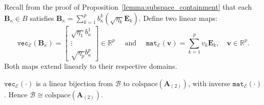 \documentclass{siamart251216}
\newcommand{\munfold}[2]{\mathbf{#1}_{(#2)}}
\def\bB{\mathbf{B}}
\def\bE{\mathbf{E}}
\def\bv{\mathbf{v}}
\begin{document}
Recall from the proof of Proposition~\ref{lemma:subspace_containment} that each $\bB_\kappa\in B$
satisfies $\bB_\kappa = \sum_{k=1}^p b_\kappa^k(\sqrt{\eta_k}\bE_k)$.  Define two linear maps:
\begin{equation}
\label{eq:vec_mat_ops}
    \mathtt{vec}_{\mathscr{E}}(\bB_\kappa)
    = \begin{bmatrix}\sqrt{\eta_1}b_\kappa^1\\\vdots\\\sqrt{\eta_p}b_\kappa^p\end{bmatrix}\in\mathbb{R}^p \quad  \mbox{ and } \quad
    \mathtt{mat}_{\mathscr{E}}(\bv) = \sum_{k=1}^p v_k\bE_k,\quad\bv\in\mathbb{R}^p.
\end{equation}
Both maps extend linearly to their respective domains.

\begin{lemma}
\label{lemma:B_iso_col_A2}
$\mathtt{vec}_{\mathscr{E}}(\cdot)$ is a linear bijection from $\mathscr{B}$ to
$\mathrm{colspace}(\munfold{A}{2})$, with inverse $\mathtt{mat}_{\mathscr{E}}(\cdot)$.  Hence
$\mathscr{B}\cong\mathrm{colspace}(\munfold{A}{2})$.
\end{lemma}
\end{document}
